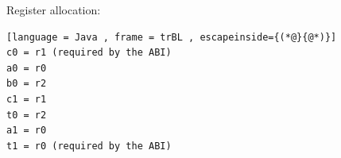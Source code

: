 Register allocation:
\begin{lstlisting}[language = Java , frame = trBL , escapeinside={(*@}{@*)}]
c0 = r1 (required by the ABI)
a0 = r0
b0 = r2
c1 = r1
t0 = r2
a1 = r0
t1 = r0 (required by the ABI)
\end{lstlisting}
